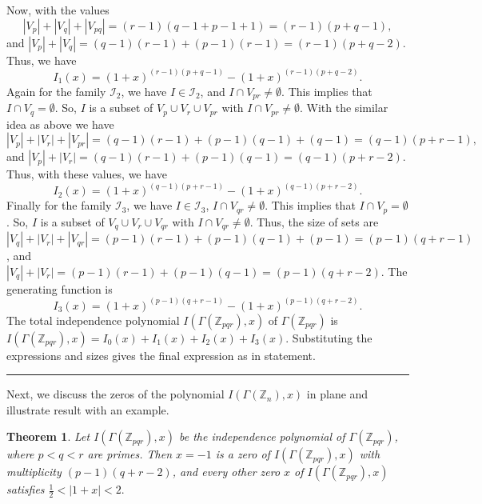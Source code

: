 \documentclass[12pt,twoside]{article}
\newtheorem{theorem}{Theorem}[section]
\renewenvironment{proof}{{\noindent\bfseries Proof.}}{\qed}
\def\qed{\nolinebreak\hfill\rule{.2cm}{.2cm}\par\addvspace{.5cm}}
\begin{document}
\begin{proof}
Now, with the values $$|V_p|+|V_q|+|V_{pq}| = (r-1)(q-1+p-1+1) = (r-1)(p+q-1),$$
and  $|V_p|+|V_q| = (q-1)(r-1)+(p-1)(r-1) = (r-1)(p+q-2)$. Thus,  we have
$$I_1(x) = (1+x)^{(r-1)(p+q-1)} - (1+x)^{(r-1)(p+q-2)}.$$
Again for the family $\mathcal{I}_2$, we have  $I \in \mathcal{I}_2$, and $I \cap V_{pr} \neq \emptyset$. This implies that $I \cap V_q = \emptyset$. So, $I$ is a subset of $V_p \cup V_r \cup V_{pr}$ with $I \cap V_{pr} \neq \emptyset$. With the similar idea as above we have
$$|V_p|+|V_r|+|V_{pr}| = (q-1)(r-1)+(p-1)(q-1)+(q-1) = (q-1)(p+r-1),$$
and  $|V_p|+|V_r| = (q-1)(r-1)+(p-1)(q-1) = (q-1)(p+r-2)$. Thus, with these values, we have
$$I_2(x) = (1+x)^{(q-1)(p+r-1)} - (1+x)^{(q-1)(p+r-2)}.$$
Finally for the family $\mathcal{I}_3$, we have $I \in \mathcal{I}_3$, $I \cap V_{qr} \neq \emptyset$. This implies that $I \cap V_p = \emptyset$. So, $I$ is a subset of $V_q \cup V_r \cup V_{qr}$ with $I \cap V_{qr} \neq \emptyset$. Thus, the size of sets are 
$|V_q|+|V_r|+|V_{qr}| = (p-1)(r-1)+(p-1)(q-1)+(p-1) = (p-1)(q+r-1)$, and  $|V_q|+|V_r| = (p-1)(r-1)+(p-1)(q-1) = (p-1)(q+r-2)$. The generating function is
$$I_3(x) = (1+x)^{(p-1)(q+r-1)} - (1+x)^{(p-1)(q+r-2)}.$$
The total independence polynomial $I(\varGamma(\mathbb{Z}_{pqr}),x)$ of $\varGamma(\mathbb{Z}_{pqr})$ is $I(\varGamma(\mathbb{Z}_{pqr}),x) = I_0(x) + I_1(x) + I_2(x) + I_3(x)$. Substituting the expressions and sizes gives the final expression as in statement.
\end{proof}

Next, we discuss the zeros of the polynomial $I(\varGamma(\mathbb{Z}_{n}),x)$ in plane and illustrate result with an example.
\begin{theorem}\label{zeros pqr}
	Let $I(\varGamma(\mathbb{Z}_{pqr}),x)$ be the independence polynomial of $\varGamma(\mathbb{Z}_{pqr})$, where $p<q<r$ are primes. Then $x=-1$ is a zero of $I(\varGamma(\mathbb{Z}_{pqr}),x)$ with multiplicity $(p-1)(q+r-2)$, and every other zero $x$ of $I(\varGamma(\mathbb{Z}_{pqr}),x)$ satisfies
	$
	\tfrac12<|1+x|<2.
	$
\end{theorem}
\end{document}
